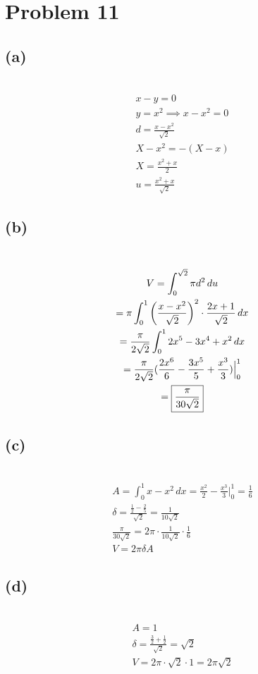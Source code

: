 \documentclass[12pt]{article}
\newcommand*{\paren}[1]{\ensuremath\left(#1\right)}
\newcommand{\problem}[1]{\section{Problem #1}}
\newcommand{\subproblem}[1]{\subsection{(#1)} \,}
\begin{document}
\problem{11}

\subproblem{a}
\begin{gather*}
    x-y=0\\
    y=x^2 \implies x-x^2=0\\
    d= \boxed{\frac{x-x^2}{\sqrt{2}}}\\
    X-x^2=-(X-x)\\
    X=\frac{x^2+x}{2}\\
    u=\boxed{\frac{x^2+x}{\sqrt{2}}}
\end{gather*}

\subproblem{b}
\begin{gather*}
        V=\int_0^{\sqrt{2}}\pi d^2\, du\\
        =\pi \int_0^1 \paren{\frac{x-x^2}{\sqrt{2}}}^2 \cdot \frac{2x+1}{\sqrt{2}}\, dx\\
        = \frac{\pi}{2\sqrt{2}}\int_0^1 2x^5-3x^4+x^2\, dx\\
        = \frac{\pi}{2\sqrt{2}} ( \frac{2x^6}{6} - \frac{3x^5}{5}+ \frac{x^3}{3})\Big|_0^1\\
        =\boxed{\frac{\pi}{30\sqrt{2}}}
\end{gather*}

\subproblem{c}
\begin{gather*}
    A =\int_0^1 x-x^2\, dx = \frac{x^2}{2}-\frac{x^3}{3}\Big|_0^1=\frac{1}{6}\\
    \delta = \frac{\frac{1}{2}-\frac{2}{5}}{\sqrt{2}} = \frac{1}{10\sqrt{2}}\\
    \frac{\pi}{30\sqrt{2}} = 2\pi \cdot \frac{1}{10\sqrt{2}}\cdot \frac{1}{6}\\
    \boxed{V=2\pi \delta A}
\end{gather*}

\subproblem{d}
\begin{gather*}
    A=1\\
    \delta = \frac{\frac{3}{2}+\frac{1}{2}}{\sqrt{2}} = \sqrt{2}\\
    V=2\pi \cdot \sqrt{2} \cdot 1 = \boxed{2\pi \sqrt{2}}
\end{gather*}
\end{document}
